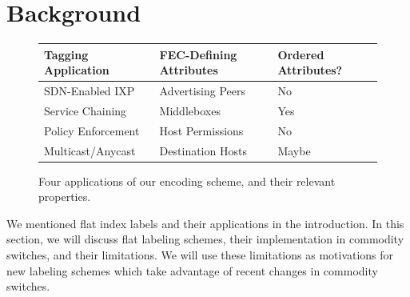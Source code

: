 \section{Background} \label{sec:background}


\begin{figure}
    \begin{tabular}{| p{2.5cm} | p{2cm} | p{2cm} |}
    \hline
    Tagging Application & FEC-Defining Attributes & Ordered Attributes?\\ \hline
    SDN-Enabled IXP & Advertising Peers & No \\ \hline
    Service Chaining & Middleboxes& Yes \\ \hline
    Policy Enforcement & Host Permissions & No \\ \hline
    Multicast/Anycast & Destination Hosts & Maybe \\
    \hline
    \end{tabular}
    \caption{Four applications of our encoding scheme, and their relevant properties. } 
    \label{tab:applications}
\end{figure}


We mentioned flat index labels and their applications in the introduction. In this section, we will discuss flat labeling schemes, their implementation in commodity switches, and their limitations. We will use these limitations as motivations for new labeling schemes which take advantage of recent changes in commodity switches.

